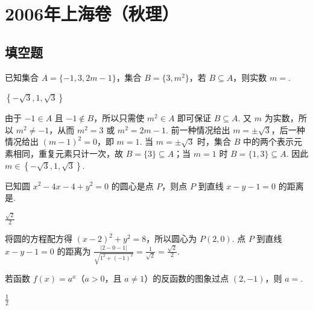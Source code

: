 \chapter{2006年上海卷（秋理）}
\section{填空题}
\begin{problem}
已知集合 \(A = \{-1, 3, 2m - 1\}\)，集合 \(B = \{3, m^2\}\)，若 \(B \subseteq A\)，则实数 \(m = \)\fillinblank{}.
\end{problem}

\begin{answer}
\(\left\{-\sqrt{3},1,\sqrt{3}\right\}\)
\end{answer}

\begin{solution}
由于 \(-1\in A\) 且 \(-1\notin B\)，所以只需使 \(m^2\in A\) 即可保证 \(B\subseteq A\). 又 \(m\) 为实数，所以 \(m^2\neq-1\)，从而 \(m^2=3\) 或 \(m^2=2m-1\). 前一种情况给出 \(m=\pm\sqrt{3}\)，后一种情况给出 \((m-1)^2=0\)，即 \(m=1\). 当 \(m=\pm\sqrt{3}\) 时，集合 \(B\) 中的两个表示元素相同，重复元素只计一次，故 \(B=\{3\}\subseteq A\)；当 \(m=1\) 时 \(B=\{1,3\}\subseteq A\). 因此 \(m\in\left\{-\sqrt{3},1,\sqrt{3}\right\}\).
\end{solution}

\begin{problem}
已知圆 \(x^{2} - 4x - 4 + y^{2} = 0\) 的圆心是点 \(P\)，则点 \(P\) 到直线 \(x - y - 1 = 0\) 的距离是\fillinblank{}.
\end{problem}

\begin{answer}
\(\frac{\sqrt{2}}{2}\)
\end{answer}

\begin{solution}
将圆的方程配方得 \((x-2)^2+y^2=8\)，所以圆心为 \(P(2,0)\). 点 \(P\) 到直线 \(x-y-1=0\) 的距离为
\(\displaystyle \frac{|2-0-1|}{\sqrt{1^2+(-1)^2}}=\frac{1}{\sqrt{2}}=\frac{\sqrt{2}}{2}\).
\end{solution}

\begin{problem}
若函数 \( f(x) = a^x \)（\(a > 0\)，且 \(a \neq 1\)）的反函数的图象过点 \((2,-1)\)，则 \( a = \)\fillinblank{}.
\end{problem}

\begin{answer}
\(\frac{1}{2}\)
\end{answer}

